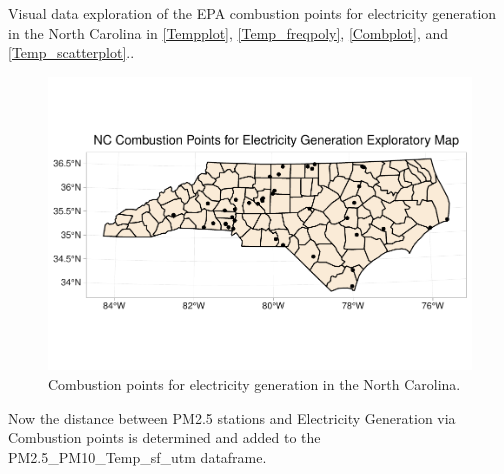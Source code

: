 \documentclass[12pt,]{article}
\begin{document}
Visual data exploration of the EPA combustion points for electricity
generation in the North Carolina in \autoref{Tempplot},
\autoref{Temp_freqpoly}, \autoref{Combplot}, and
\autoref{Temp_scatterplot}..

\begin{figure}
\centering
\includegraphics{./Outputunnamed-chunk-35-1.pdf}
\caption{Combustion points for electricity generation in the North
Carolina. \label{Combplot}}
\end{figure}

Now the distance between PM2.5 stations and Electricity Generation via
Combustion points is determined and added to the
PM2.5\_PM10\_Temp\_sf\_utm dataframe.
\end{document}
